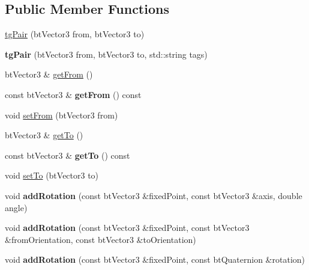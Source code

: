\subsection*{Public Member Functions}
\begin{DoxyCompactItemize}
\item 
\hyperlink{classtg_pair_abc00b76d5026561c5cf8025cfe77520f}{tg\-Pair} (bt\-Vector3 from, bt\-Vector3 to)
\item 
\hypertarget{classtg_pair_a31e737e6c443478996ff23fcfe98d739}{{\bfseries tg\-Pair} (bt\-Vector3 from, bt\-Vector3 to, std\-::string tags)}\label{classtg_pair_a31e737e6c443478996ff23fcfe98d739}

\item 
bt\-Vector3 \& \hyperlink{classtg_pair_af977dd8f19b84ae27b0d4d61f73a795a}{get\-From} ()
\item 
\hypertarget{classtg_pair_a0a3cb71fb347992918be8179fc88026c}{const bt\-Vector3 \& {\bfseries get\-From} () const }\label{classtg_pair_a0a3cb71fb347992918be8179fc88026c}

\item 
void \hyperlink{classtg_pair_a5e15e2aada37ec92a0de956e14029200}{set\-From} (bt\-Vector3 from)
\item 
bt\-Vector3 \& \hyperlink{classtg_pair_a307e3a7d285b79337d5a5106b741537e}{get\-To} ()
\item 
\hypertarget{classtg_pair_ace352e2229cbb8689ff1ed6203a44132}{const bt\-Vector3 \& {\bfseries get\-To} () const }\label{classtg_pair_ace352e2229cbb8689ff1ed6203a44132}

\item 
void \hyperlink{classtg_pair_afa57f88dc9997c1dd10bcc78815774ee}{set\-To} (bt\-Vector3 to)
\item 
\hypertarget{classtg_pair_ab78b53c5899b1584e1333f350f9d6d10}{void {\bfseries add\-Rotation} (const bt\-Vector3 \&fixed\-Point, const bt\-Vector3 \&axis, double angle)}\label{classtg_pair_ab78b53c5899b1584e1333f350f9d6d10}

\item 
\hypertarget{classtg_pair_ac362bfbe98f8887115df7802b905adba}{void {\bfseries add\-Rotation} (const bt\-Vector3 \&fixed\-Point, const bt\-Vector3 \&from\-Orientation, const bt\-Vector3 \&to\-Orientation)}\label{classtg_pair_ac362bfbe98f8887115df7802b905adba}

\item 
\hypertarget{classtg_pair_a21e7ae1d2e7e3d23d771545b0ad2a9a8}{void {\bfseries add\-Rotation} (const bt\-Vector3 \&fixed\-Point, const bt\-Quaternion \&rotation)}\label{classtg_pair_a21e7ae1d2e7e3d23d771545b0ad2a9a8}


\end{DoxyCompactItemize}
